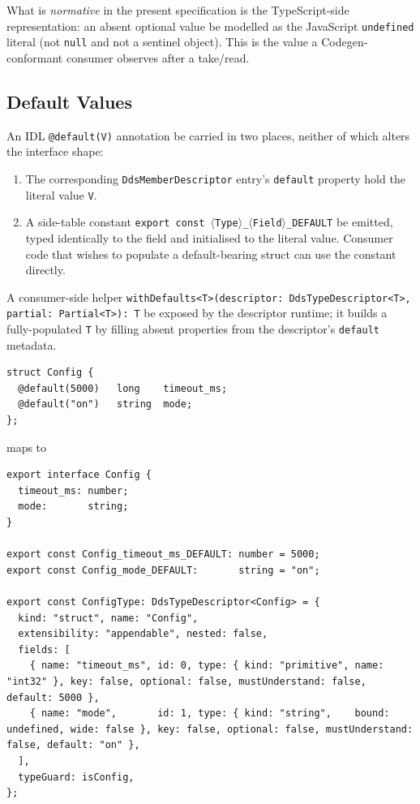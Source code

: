 \documentclass{../styles/zerodds-vendor-spec}
\begin{document}
What is \emph{normative} in the present specification is the
TypeScript-side representation: an absent optional value
 be modelled as the JavaScript \texttt{undefined}
literal (not \texttt{null} and not a sentinel object). This is the
value a Codegen-conformant consumer observes after a take/read.

\subsection{Default Values}

An IDL \texttt{@default(V)} annotation  be carried in
two places, neither of which alters the interface shape:

\begin{enumerate}
  \item The corresponding \texttt{DdsMemberDescriptor} entry's
        \texttt{default} property  hold the literal
        value \texttt{V}.
  \item A side-table constant
        \texttt{export const $\langle$Type$\rangle$\_$\langle$Field$\rangle$\_DEFAULT}
         be emitted, typed identically to the field
        and initialised to the literal value. Consumer code that
        wishes to populate a default-bearing struct can use the
        constant directly.
\end{enumerate}

A consumer-side helper
\texttt{withDefaults<T>(descriptor:\,DdsTypeDescriptor<T>,\\
partial:\,Partial<T>):\,T}  be exposed by the
descriptor runtime; it builds a fully-populated \texttt{T} by
filling absent properties from the descriptor's \texttt{default}
metadata.

\begin{specexample}
\begin{lstlisting}
struct Config {
  @default(5000)   long    timeout_ms;
  @default("on")   string  mode;
};
\end{lstlisting}
maps to
\begin{lstlisting}
export interface Config {
  timeout_ms: number;
  mode:       string;
}

export const Config_timeout_ms_DEFAULT: number = 5000;
export const Config_mode_DEFAULT:       string = "on";

export const ConfigType: DdsTypeDescriptor<Config> = {
  kind: "struct", name: "Config",
  extensibility: "appendable", nested: false,
  fields: [
    { name: "timeout_ms", id: 0, type: { kind: "primitive", name: "int32" }, key: false, optional: false, mustUnderstand: false, default: 5000 },
    { name: "mode",       id: 1, type: { kind: "string",    bound: undefined, wide: false }, key: false, optional: false, mustUnderstand: false, default: "on" },
  ],
  typeGuard: isConfig,
};
\end{lstlisting}
\end{specexample}
\end{document}

